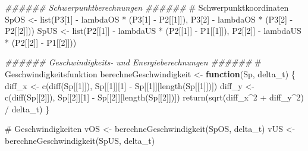 \documentclass[
  letterpaper,
  DIV=11]{scrartcl}
\newenvironment{Shaded}{\begin{snugshade}}{\end{snugshade}}
\newcommand{\CommentTok}[1]{\textcolor[rgb]{0.37,0.37,0.37}{#1}}
\newcommand{\ControlFlowTok}[1]{\textcolor[rgb]{0.00,0.23,0.31}{\textbf{#1}}}
\newcommand{\DecValTok}[1]{\textcolor[rgb]{0.68,0.00,0.00}{#1}}
\newcommand{\DocumentationTok}[1]{\textcolor[rgb]{0.37,0.37,0.37}{\textit{#1}}}
\newcommand{\FunctionTok}[1]{\textcolor[rgb]{0.28,0.35,0.67}{#1}}
\newcommand{\NormalTok}[1]{\textcolor[rgb]{0.00,0.23,0.31}{#1}}
\newcommand{\OtherTok}[1]{\textcolor[rgb]{0.00,0.23,0.31}{#1}}
\newcommand{\SpecialCharTok}[1]{\textcolor[rgb]{0.37,0.37,0.37}{#1}}
\begin{document}
\begin{Shaded}
\begin{Highlighting}[]
\DocumentationTok{\#\#\#\#\#\# Schwerpunktberechnungen \#\#\#\#\#\#}
\CommentTok{\# Schwerpunktkoordinaten}
\NormalTok{SpOS }\OtherTok{\textless{}{-}} \FunctionTok{list}\NormalTok{(P3[}\DecValTok{1}\NormalTok{] }\SpecialCharTok{{-}}\NormalTok{ lambdaOS }\SpecialCharTok{*}\NormalTok{ (P3[}\DecValTok{1}\NormalTok{] }\SpecialCharTok{{-}}\NormalTok{ P2[[}\DecValTok{1}\NormalTok{]]), }
\NormalTok{             P3[}\DecValTok{2}\NormalTok{] }\SpecialCharTok{{-}}\NormalTok{ lambdaOS }\SpecialCharTok{*}\NormalTok{ (P3[}\DecValTok{2}\NormalTok{] }\SpecialCharTok{{-}}\NormalTok{ P2[[}\DecValTok{2}\NormalTok{]]))}
\NormalTok{SpUS }\OtherTok{\textless{}{-}} \FunctionTok{list}\NormalTok{(P2[[}\DecValTok{1}\NormalTok{]] }\SpecialCharTok{{-}}\NormalTok{ lambdaUS }\SpecialCharTok{*}\NormalTok{ (P2[[}\DecValTok{1}\NormalTok{]] }\SpecialCharTok{{-}}\NormalTok{ P1[[}\DecValTok{1}\NormalTok{]]), }
\NormalTok{             P2[[}\DecValTok{2}\NormalTok{]] }\SpecialCharTok{{-}}\NormalTok{ lambdaUS }\SpecialCharTok{*}\NormalTok{ (P2[[}\DecValTok{2}\NormalTok{]] }\SpecialCharTok{{-}}\NormalTok{ P1[[}\DecValTok{2}\NormalTok{]]))}

\DocumentationTok{\#\#\#\#\#\# Geschwindigkeits{-} und Energieberechnungen \#\#\#\#\#\#}
\CommentTok{\# Geschwindigkeitsfunktion}
\NormalTok{berechneGeschwindigkeit }\OtherTok{\textless{}{-}} \ControlFlowTok{function}\NormalTok{(Sp, delta\_t) \{}
\NormalTok{    diff\_x }\OtherTok{\textless{}{-}} \FunctionTok{c}\NormalTok{(}\FunctionTok{diff}\NormalTok{(Sp[[}\DecValTok{1}\NormalTok{]]), Sp[[}\DecValTok{1}\NormalTok{]][}\DecValTok{1}\NormalTok{] }\SpecialCharTok{{-}}\NormalTok{ Sp[[}\DecValTok{1}\NormalTok{]][}\FunctionTok{length}\NormalTok{(Sp[[}\DecValTok{1}\NormalTok{]])])}
\NormalTok{    diff\_y }\OtherTok{\textless{}{-}} \FunctionTok{c}\NormalTok{(}\FunctionTok{diff}\NormalTok{(Sp[[}\DecValTok{2}\NormalTok{]]), Sp[[}\DecValTok{2}\NormalTok{]][}\DecValTok{1}\NormalTok{] }\SpecialCharTok{{-}}\NormalTok{ Sp[[}\DecValTok{2}\NormalTok{]][}\FunctionTok{length}\NormalTok{(Sp[[}\DecValTok{2}\NormalTok{]])])}
    \FunctionTok{return}\NormalTok{(}\FunctionTok{sqrt}\NormalTok{(diff\_x}\SpecialCharTok{\^{}}\DecValTok{2} \SpecialCharTok{+}\NormalTok{ diff\_y}\SpecialCharTok{\^{}}\DecValTok{2}\NormalTok{) }\SpecialCharTok{/}\NormalTok{ delta\_t)}
\NormalTok{\}}

\CommentTok{\# Geschwindigkeiten}
\NormalTok{vOS }\OtherTok{\textless{}{-}} \FunctionTok{berechneGeschwindigkeit}\NormalTok{(SpOS, delta\_t)}
\NormalTok{vUS }\OtherTok{\textless{}{-}} \FunctionTok{berechneGeschwindigkeit}\NormalTok{(SpUS, delta\_t)}


\end{Highlighting}
\end{Shaded}
\end{document}
